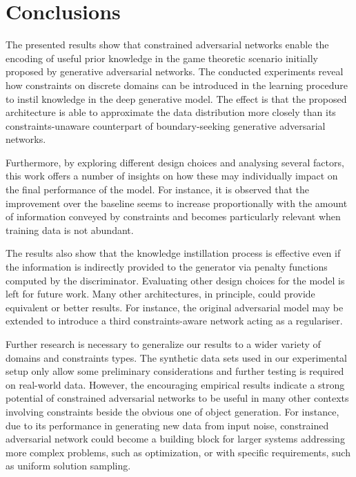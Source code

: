 \chapter{Conclusions}
\label{ch:conclusions}

The presented results show that constrained adversarial networks enable the encoding of useful prior knowledge in the game theoretic scenario initially proposed by generative adversarial networks. The conducted experiments reveal how constraints on discrete domains can be introduced in the learning procedure to instil knowledge in the deep generative model. The effect is that the proposed architecture is able to approximate the data distribution more closely than its constraints-unaware counterpart of boundary-seeking generative adversarial networks.

Furthermore, by exploring different design choices and analysing several factors, this work offers a number of insights on how these may individually impact on the final performance of the model. For instance, it is observed that the improvement over the baseline seems to increase proportionally with the amount of information conveyed by constraints and becomes particularly relevant when training data is not abundant.

The results also show that the knowledge instillation process is effective even if the information is indirectly provided to the generator via penalty functions computed by the discriminator. Evaluating other design choices for the model is left for future work. Many other architectures, in principle, could provide equivalent or better results. For instance, the original adversarial model may be extended to introduce a third constraints-aware network acting as a regulariser.

Further research is necessary to generalize our results to a wider variety of domains and constraints types. The synthetic data sets used in our experimental setup only allow some preliminary considerations and further testing is required on real-world data. However, the encouraging empirical results indicate a strong potential of constrained adversarial networks to be useful in many other contexts involving constraints beside the obvious one of object generation. For instance, due to its performance in generating new data from input noise, constrained adversarial network could become a building block for larger systems addressing more complex problems, such as optimization, or with specific requirements, such as uniform solution sampling.
